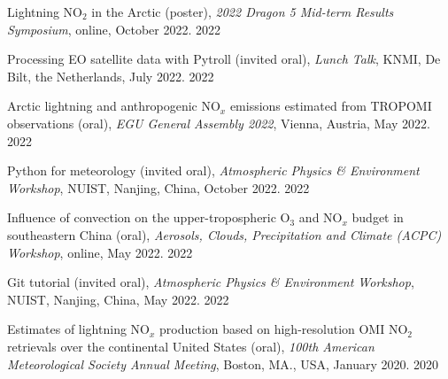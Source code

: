 \clearpage
{}


\begin{cvpublications}

\publication
{Lightning NO$_2$ in the Arctic (poster),
\emph{2022 Dragon 5 Mid-term Results Symposium},
online, October 2022.} %
{2022} %

\publication
{Processing EO satellite data with Pytroll (invited oral),
\emph{Lunch Talk},
KNMI, De Bilt, the Netherlands, July 2022.} %
{2022} %

\publication
{Arctic lightning and anthropogenic NO$_x$ emissions estimated from TROPOMI observations (oral),
\emph{EGU General Assembly 2022},
Vienna, Austria, May 2022.} %
{2022} %

\publication
{Python for meteorology (invited oral),
\emph{Atmospheric Physics \& Environment Workshop},
NUIST, Nanjing, China, October 2022.} %
{2022} %

\publication
{Influence of convection on the upper-tropospheric O$_3$ and NO$_x$ budget in southeastern China (oral),
\emph{Aerosols, Clouds, Precipitation and Climate (ACPC) Workshop},
online, May 2022.} %
{2022} %

\publication
{Git tutorial (invited oral),
\emph{Atmospheric Physics \& Environment Workshop},
NUIST, Nanjing, China, May 2022.} %
{2022} %

\publication
{Estimates of lightning NO$_x$ production based on high-resolution OMI NO$_2$ retrievals over the continental United States (oral),
\emph{100th American Meteorological Society Annual Meeting},
Boston, MA., USA, January 2020.} %
{2020} %



\end{cvpublications}
